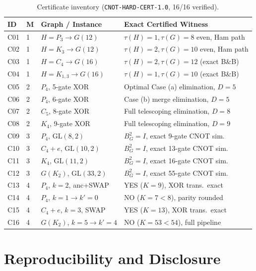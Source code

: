 \documentclass[10pt,twocolumn]{article}
\begin{document}
\begin{table}[t]
\centering
\caption{Certificate inventory (\texttt{CNOT-HARD-CERT-1.0}, 16/16 verified).}
\label{tab:certs}
\scriptsize
\setlength{\tabcolsep}{2.5pt}
\begin{tabular}{@{}llll@{}}
\toprule
ID & M & Graph / Instance & Exact Certified Witness \\
\midrule
C01 & 1 & $H=P_3 \to G(12)$ & $\tau(H)=1, \tau(G)=8$ even, Ham path \\
C02 & 1 & $H=K_3 \to G(12)$ & $\tau(H)=2, \tau(G)=10$ even, Ham path \\
C03 & 1 & $H=C_4 \to G(16)$ & $\tau(H)=2, \tau(G)=12$ (exact B\&B) \\
C04 & 1 & $H=K_{1,3} \to G(16)$ & $\tau(H)=1, \tau(G)=10$ (exact B\&B) \\
C05 & 2 & $P_4$, 5-gate XOR & Optimal Case (a) elimination, $D=5$ \\
C06 & 2 & $P_4$, 6-gate XOR & Case (b) merge elimination, $D=5$ \\
C07 & 2 & $C_5$, 8-gate XOR & Full telescoping elimination, $D=8$ \\
C08 & 2 & $K_4$, 9-gate XOR & Full telescoping elimination, $D=9$ \\
C09 & 3 & $P_4$, $\mathrm{GL}(8,2)$ & $B_G^2=I$, exact 9-gate CNOT sim. \\
C10 & 3 & $C_4+e$, $\mathrm{GL}(10,2)$ & $B_G^2=I$, exact 13-gate CNOT sim. \\
C11 & 3 & $K_4$, $\mathrm{GL}(11,2)$ & $B_G^2=I$, exact 16-gate CNOT sim. \\
C12 & 3 & $G(K_2)$, $\mathrm{GL}(33,2)$ & $B_G^2=I$, exact 55-gate CNOT sim. \\
C13 & 4 & $P_4$, $k=2$, anc+SWAP & YES ($K=9$), XOR trans.\ exact \\
C14 & 4 & $P_4$, $k=1 \to k'=0$ & NO ($K=7 < 8$), parity rounded \\
C15 & 4 & $C_4+e$, $k=3$, SWAP & YES ($K=13$), XOR trans.\ exact \\
C16 & 4 & $G(K_2)$, $k=5 \to k'=4$ & NO ($K=53 < 54$), full pipeline \\
\bottomrule
\end{tabular}
\end{table}

\section{Reproducibility and Disclosure}
\end{document}
